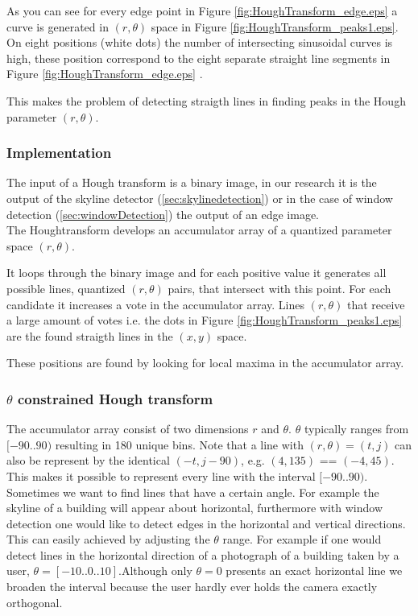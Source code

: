 	 
	 As you can see for every edge point 
	 in Figure \ref{fig:HoughTransform_edge.eps} 
	 a curve is generated in $(r,\theta)$ space in Figure 
\ref{fig:HoughTransform_peaks1.eps}.
	 On eight positions (white dots) the number of intersecting sinusoidal
	 curves is high, these position correspond to the eight separate straight
	 line segments in Figure \ref{fig:HoughTransform_edge.eps} .
	
	This makes the problem of detecting straigth lines in finding peaks in the 
	Hough parameter $(r,\theta)$.

\subsubsection{Implementation}
	The input of a Hough transform is a binary image, in our research it is the output of 
	the skyline detector (\ref{sec:skylinedetection}) or in the case of window
	detection (\ref{sec:windowDetection}) the output of an edge image.\\

	The Houghtransform develops an accumulator array of a quantized parameter space $(r, \theta)$.

	It loops through the binary image and for each positive value 
	it generates all possible lines, quantized $(r, \theta)$ pairs, that intersect with this point.
	For each candidate it increases a vote in the accumulator array.
	Lines $(r, \theta)$ that receive a large amount of votes
	i.e. the dots in Figure \ref{fig:HoughTransform_peaks1.eps} are the found straigth lines in the $(x,y)$ space.

	These positions are found by looking for local maxima in the accumulator array.

\subsubsection{$\theta$ constrained Hough transform}
The accumulator array consist of two dimensions $r$ and $\theta$.
$\theta$ typically ranges from $[-90..90)$ resulting in 180 unique bins.
Note that a line with $(r, \theta) = (t,j)$ can also be represent by the identical $(-t, j-90)$, e.g. $(4, 135)$ == $(-4, 45)$.
This makes it possible to represent every line with the interval $[-90..90)$.\\

Sometimes we want to find lines that have a certain angle.
For example the skyline of a building will appear about horizontal, furthermore with window detection one would like to detect edges in the horizontal and vertical directions.
This can easily achieved by adjusting the $\theta$ range.
For example if one would detect lines in the horizontal direction of
a photograph of a building taken by a user, $\theta = [-10..0..10]$.Although
only $\theta = 0$ presents an exact horizontal line we broaden the interval
because the user hardly ever holds the camera exactly orthogonal.
	
